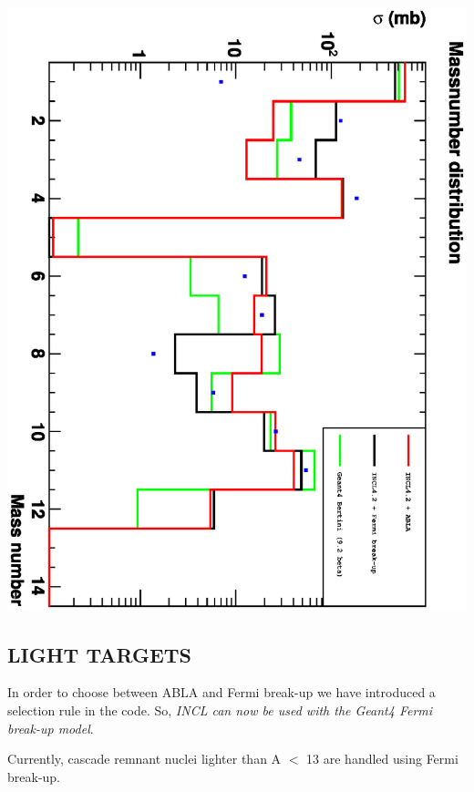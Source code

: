 \documentclass[20pt]{article}
\newenvironment{textbox}
{\begin{lrbox}{\dummybox}\begin{minipage}{0.9\columnwidth}}
{\end{minipage}\end{lrbox}\raisebox{-\depth}{\psshadowbox[framesep=1em,framearc=.1,shadow=true]{\usebox{\dummybox}}}\vspace{0.005\textheight}}
\begin{document}
\begin{center}
\begin{multicols}{3}
\begin{center}
\vspace{1cm}
\includegraphics[scale=0.67,angle=90]{images/masses.eps}
\end{center}


\begin{textbox}
\section*{{\Huge {\sf LIGHT TARGETS}}}

{\color{udsect}
In order to choose between ABLA and Fermi break-up we have
introduced a selection rule in the code. 
So, \emph{{\sf INCL} can now be used with the {\sf Geant4} Fermi break-up model}.
}

\vspace{1cm}
Currently, cascade remnant nuclei lighter than A $<$ 13 are handled using Fermi break-up.

\end{textbox}


\begin{textbox}

\end{textbox}
\end{multicols}
\end{center}
\end{document}
